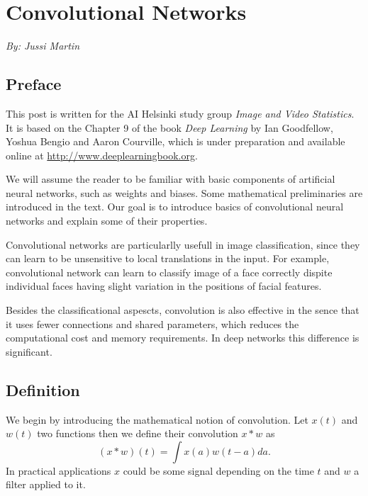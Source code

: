 \documentclass[]{article}
\begin{document}
\section{Convolutional Networks}
\begin{center}
  \emph{By: Jussi Martin}
\end{center}
\subsection{Preface}
This post is written for the AI Helsinki study group \emph{Image and Video Statistics}.
It is based on the Chapter 9 of the book \emph{Deep Learning} by Ian Goodfellow,
Yoshua Bengio and Aaron Courville, which is under preparation and available
online at \url{http://www.deeplearningbook.org}.

We will assume the reader to be familiar with basic components of artificial
neural networks, such as weights and biases. Some mathematical preliminaries are
introduced in the text. Our goal is to introduce basics of convolutional neural
networks and explain some of their properties.

Convolutional networks are particularlly usefull in image classification, since
they can learn to be unsensitive to local translations in the input. For example,
convolutional network can learn to classify image of a face correctly dispite
individual faces having slight variation in the positions of facial features.

Besides the classificational aspescts, convolution is also effective in the sence
that it uses fewer connections and shared parameters, which reduces the
computational cost and memory requirements. In deep networks this difference is
significant.



\subsection{Definition}
We begin by introducing the mathematical notion of convolution. Let $x(t)$ and $w(t)$
two functions then we define their convolution $x * w$ as
\[
(x * w)(t) = \int x(a)w(t - a)da.
\]
In practical applications $x$ could be some signal depending on the time $t$ and
$w$ a filter applied to it.
\end{document}
